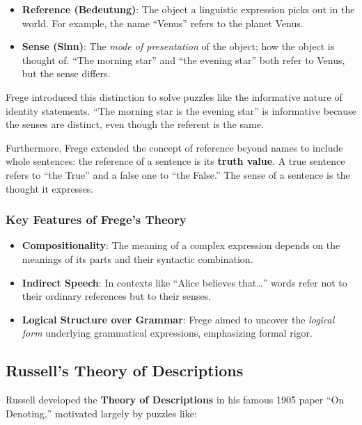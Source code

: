 \documentclass[12pt]{article}
\begin{document}
\begin{itemize}
\item
  \textbf{Reference (Bedeutung)}: The object a linguistic expression
  picks out in the world. For example, the name ``Venus'' refers to the
  planet Venus.
\item
  \textbf{Sense (Sinn)}: The \emph{mode of presentation} of the object;
  how the object is thought of. ``The morning star'' and ``the evening
  star'' both refer to Venus, but the sense differs.
\end{itemize}

Frege introduced this distinction to solve puzzles like the informative
nature of identity statements. ``The morning star is the evening star''
is informative because the senses are distinct, even though the referent
is the same.

Furthermore, Frege extended the concept of reference beyond names to
include whole sentences: the reference of a sentence is its
\textbf{truth value}. A true sentence refers to ``the True'' and a false
one to ``the False.'' The sense of a sentence is the thought it
expresses.

\hypertarget{key-features-of-freges-theory}{%
\subsubsection{Key Features of Frege's
Theory}\label{key-features-of-freges-theory}}

\begin{itemize}
\item
  \textbf{Compositionality}: The meaning of a complex expression depends
  on the meanings of its parts and their syntactic combination.
\item
  \textbf{Indirect Speech}: In contexts like ``Alice believes
  that\ldots{}'' words refer not to their ordinary references but to
  their senses.
\item
  \textbf{Logical Structure over Grammar}: Frege aimed to uncover the
  \emph{logical form} underlying grammatical expressions, emphasizing
  formal rigor.
\end{itemize}

\hypertarget{russells-theory-of-descriptions}{%
\subsection{Russell's Theory of
Descriptions}\label{russells-theory-of-descriptions}}

Russell developed the \textbf{Theory of Descriptions} in his famous 1905
paper ``On Denoting,'' motivated largely by puzzles like:
\end{document}
